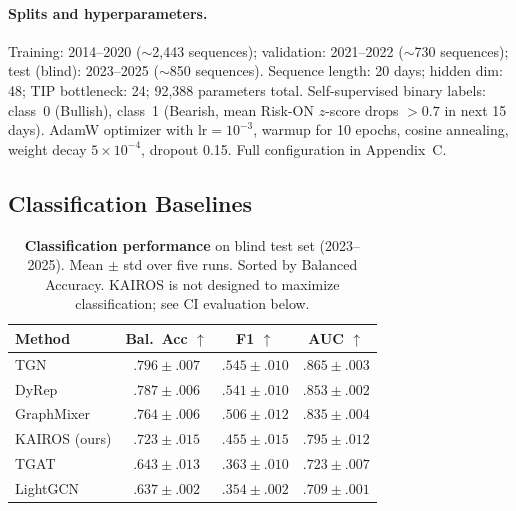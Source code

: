 \documentclass[11pt]{article}
\begin{document}
\paragraph{Splits and hyperparameters.} Training: 2014--2020 ($\sim$2,443 sequences); validation: 2021--2022 ($\sim$730 sequences); test (blind): 2023--2025 ($\sim$850 sequences). Sequence length: 20 days; hidden dim: 48; TIP bottleneck: 24; 92,388 parameters total. Self-supervised binary labels: class~0 (Bullish), class~1 (Bearish, mean Risk-ON $z$-score drops $>0.7$ in next 15 days). AdamW optimizer with $\text{lr}=10^{-3}$, warmup for 10 epochs, cosine annealing, weight decay $5 \times 10^{-4}$, dropout 0.15. Full configuration in Appendix~C.

\subsection{Classification Baselines}

\begin{table}[t]
\centering
\caption{\textbf{Classification performance} on blind test set (2023--2025). Mean $\pm$ std over five runs. Sorted by Balanced Accuracy. KAIROS is not designed to maximize classification; see CI evaluation below.}
\label{tab:baselines}
\small
\begin{tabular}{lccc}
\toprule
\textbf{Method} & \textbf{Bal.\ Acc} $\uparrow$ & \textbf{F1} $\uparrow$ & \textbf{AUC} $\uparrow$ \\
\midrule
TGN~\citep{rossi2020tgn}         & $\mathbf{.796 \pm .007}$ & $\mathbf{.545 \pm .010}$ & $\mathbf{.865 \pm .003}$ \\
DyRep~\citep{trivedi2019dyrep}   & $.787 \pm .006$ & $.541 \pm .010$ & $.853 \pm .002$ \\
GraphMixer~\citep{cong2023graphmixer} & $.764 \pm .006$ & $.506 \pm .012$ & $.835 \pm .004$ \\
KAIROS (ours)                     & $.723 \pm .015$ & $.455 \pm .015$ & $.795 \pm .012$ \\
TGAT~\citep{xu2020tgat}          & $.643 \pm .013$ & $.363 \pm .010$ & $.723 \pm .007$ \\
LightGCN~\citep{he2020lightgcn}  & $.637 \pm .002$ & $.354 \pm .002$ & $.709 \pm .001$ \\
\bottomrule
\end{tabular}
\end{table}
\end{document}
